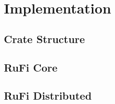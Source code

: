 
\chapter{Implementation}
\label{chap:Implementation}

\section{Crate Structure}

\section{RuFi Core}

\section{RuFi Distributed}
